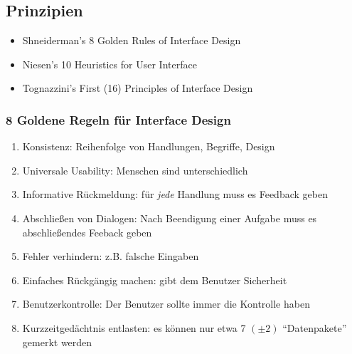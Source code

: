 \documentclass[a4paper,10pt]{article}
\begin{document}
\subsection{Prinzipien}
\begin{itemize}
	\item Shneiderman's 8 Golden Rules of Interface Design
	\item Niesen's 10 Heuristics for User Interface
	\item Tognazzini's First (16) Principles of Interface Design
\end{itemize}

\subsubsection{8 Goldene Regeln für Interface Design}
\begin{enumerate}
	\item Konsistenz: Reihenfolge von Handlungen, Begriffe, Design
	\item Universale Usability: Menschen sind unterschiedlich
	\item Informative Rückmeldung: für \emph{jede} Handlung muss es Feedback geben
	\item Abschließen von Dialogen: Nach Beendigung einer Aufgabe muss es abschließendes Feeback geben
	\item Fehler verhindern: z.B. falsche Eingaben
	\item Einfaches Rückgängig machen: gibt dem Benutzer Sicherheit
	\item Benutzerkontrolle: Der Benutzer sollte immer die Kontrolle haben
	\item Kurzzeitgedächtnis entlasten: es können nur etwa 7 $(\pm2)$ “Datenpakete” gemerkt werden
\end{enumerate}
\end{document}
